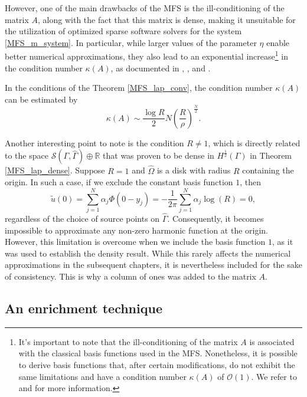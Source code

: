 However, one of the main drawbacks of the \ac{MFS} is the ill-conditioning of the matrix \(A\), along with the fact that this matrix is dense, making it unsuitable for the utilization of optimized sparse software solvers for the system \eqref{MFS_m_system}. In particular, while larger values of the parameter \(\eta\) enable better numerical approximations, they also lead to an exponential increase\footnote{It's important to note that the ill-conditioning of the matrix \(A\) is associated with the classical basis functions used in the \ac{MFS}. Nonetheless, it is possible to derive basis functions that, after certain modifications, do not exhibit the same limitations and have a condition number \(\kappa(A)\) of \(\mathcal{O}(1)\). We refer to \cite{antunes2018reducing} and \cite{antunes2018numerical} for more information.} in the condition number \(\kappa(A)\), as documented in \cite{christiansen1981condition}, \cite{kitagawa1988numerical}, and \cite{kitagawa1991asymptotic}.

\begin{theorem}
    In the conditions of the Theorem \ref{MFS_lap_conv}, the condition number \(\kappa(A)\) can be estimated by
    \[
        \kappa(A) \sim \frac{\log R}{2}N \left(\frac{R}{\rho}\right)^{\frac{N}{2}}.
    \]
\end{theorem}

Another interesting point to note is the condition \(R \neq 1\), which is directly related to the space \(\mathcal{S}(\Gamma, \hat{\Gamma}) \oplus \mathbb{R}\) that was proven to be dense in \(H^\frac{1}{2}(\Gamma)\) in Theorem \ref{MFS_lap_dense}. Suppose \(R=1\) and \(\hat{\Omega}\) is a disk with radius \(R\) containing the origin. In such a case, if we exclude the constant basis function \(1\), then
\[
\tilde{u}(0) = \sum_{j=1}^{N}\alpha_j \Phi(0-y_j) = -\frac{1}{2\pi}\sum_{j=1}^{N}\alpha_j \log(R) = 0,
\]
regardless of the choice of source points on \(\hat{\Gamma}\). Consequently, it becomes impossible to approximate any non-zero harmonic function at the origin. However, this limitation is overcome when we include the basis function \(1\), as it was used to establish the density result. While this rarely affects the numerical approximations in the subsequent chapters, it is nevertheless included for the sake of consistency. This is why a column of ones was added to the matrix \(A\).

\subsection{An enrichment technique}\label{m_particular_solutions}

